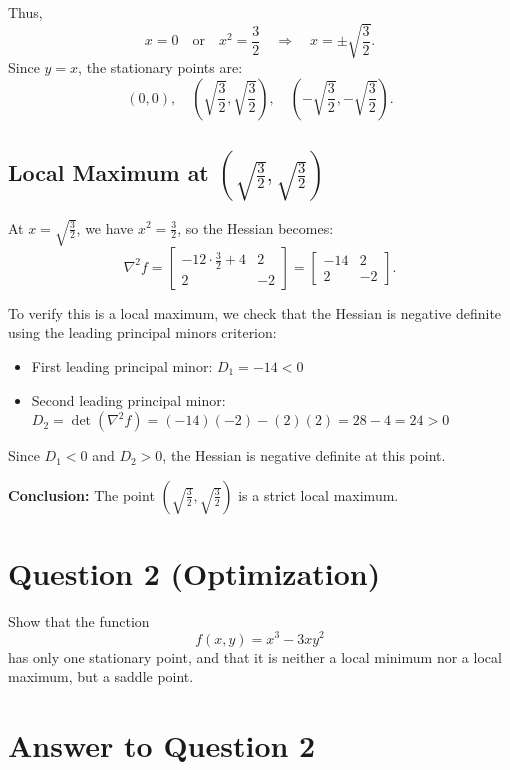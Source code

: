 \documentclass{article}
\begin{document}
Thus,
\[
x=0 \quad \text{or} \quad x^2=\frac{3}{2} \quad \Rightarrow \quad x=\pm\sqrt{\frac{3}{2}}.
\]
Since $y=x$, the stationary points are:
\[
(0,0),\quad
\left(\sqrt{\frac{3}{2}},\sqrt{\frac{3}{2}}\right),\quad
\left(-\sqrt{\frac{3}{2}},-\sqrt{\frac{3}{2}}\right).
\]

\subsection*{Local Maximum at $\left(\sqrt{\frac{3}{2}},\sqrt{\frac{3}{2}}\right)$}

At $x=\sqrt{\frac{3}{2}}$, we have $x^2=\frac{3}{2}$, so the Hessian becomes:
\[
\nabla^2 f=
\begin{bmatrix}
-12\cdot\frac{3}{2}+4 & 2\\
2 & -2
\end{bmatrix}
=
\begin{bmatrix}
-14 & 2\\
2 & -2
\end{bmatrix}.
\]

To verify this is a local maximum, we check that the Hessian is negative definite using the leading principal minors criterion:
\begin{itemize}
    \item First leading principal minor: $D_1=-14<0$ \checkmark
    \item Second leading principal minor: $D_2=\det(\nabla^2 f)=(-14)(-2)-(2)(2)=28-4=24>0$ \checkmark
\end{itemize}

Since $D_1<0$ and $D_2>0$, the Hessian is negative definite at this point.

\textbf{Conclusion:} The point $\left(\sqrt{\frac{3}{2}},\sqrt{\frac{3}{2}}\right)$ is a strict local maximum.

\newpage

\section*{Question 2 (Optimization)}

Show that the function
\[
f(x,y)=x^3-3xy^2
\]
has only one stationary point, and that it is neither a local minimum nor a local maximum, but a saddle point.

\section*{Answer to Question 2}
\end{document}
